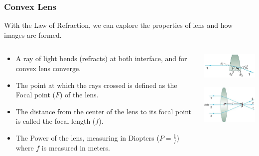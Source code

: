 \documentclass{beamer}
\begin{document}
\begin{frame}\frametitle{Convex Lens}
With the Law of Refraction, we can explore the properties of lens and how images are formed.
\begin{columns}
\begin{column}{6cm}
\begin{itemize}
\item A ray of light bends (refracts) at both interface, and for convex lens converge.
\item The point at which the rays crossed is defined as the Focal point ($F$) of the lens.
\item The distance from the center of the lens to its focal point is called the focal length ($f$).
\item The Power of the lens, measuring in Diopters ($P=\frac{1}{f}$) where $f$ is measured in meters.
\end{itemize}
\end{column}
\begin{column}{5cm}
\begin{center}
\includegraphics[width=4cm]{fig/convex1.jpg}

\vspace{0.25cm}
\includegraphics[width=4cm]{fig/convex2.jpg}
\end{center}
\end{column}
\end{columns}
\end{frame}
\end{document}
